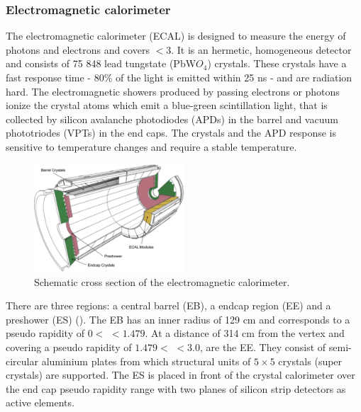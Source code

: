 \subsubsection{Electromagnetic calorimeter}
The electromagnetic calorimeter (ECAL) is designed to measure the energy of photons and electrons and covers \abspsrap $<3$. It is an hermetic, homogeneous detector and consists of 75 848 lead tungstate (PbW$O_4$) crystals. These crystals have a fast response time - 80\% of the light is emitted within 25 \si{ \nano \second} - and are radiation hard. The electromagnetic showers produced by passing electrons or photons ionize the crystal atoms which emit a blue-green scintillation light, that is collected by silicon avalanche photodiodes (APDs) in the barrel and vacuum phototriodes (VPTs) in the end caps. The crystals and the APD response is sensitive to temperature changes and require a stable temperature. 

\begin{figure}[ht]
	\centering
	\includegraphics[width=0.5\textwidth]{2_ExperimentalSetup/Figures/imageedit_5_8264930617}
	\caption{Schematic cross section of the electromagnetic calorimeter\cite{Chatrchyan:2008aa}.}
	\label{fig:ECAL}
\end{figure}
There are three regions: a central barrel (EB), a endcap region (EE) and a preshower (ES) (). 
The EB has an inner radius of 129 \si{ \centi \meter} and corresponds to a pseudo rapidity of $0 < $ \abspsrap $<1.479$. At a distance of 314 \si{ \centi \meter} from the vertex and covering a pseudo rapidity of $1.479 < $ \abspsrap $<3.0$, are the EE. They consist of semi-circular aluminium plates from which structural units of $5\times5$ crystals (super crystals) are supported. The ES is placed in front of the crystal calorimeter over the end cap pseudo rapidity range with two planes of silicon strip detectors as active elements. 

